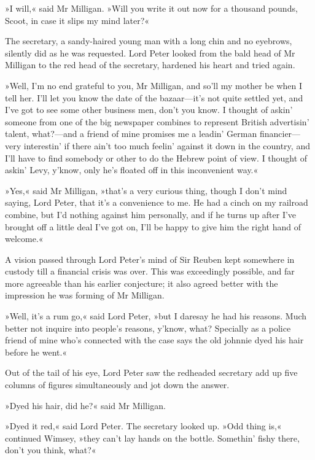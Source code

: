 »I will,« said Mr Milligan. »Will you write it out now for a thousand pounds, Scoot, in case it slips my mind later?«

The secretary, a sandy-haired young man with a long chin and no eyebrows, silently did as he was requested. Lord Peter looked from the bald head of Mr Milligan to the red head of the secretary, hardened his heart and tried again.

»Well, I'm no end grateful to you, Mr Milligan, and so'll my mother be when I tell her. I'll let you know the date of the bazaar\allowbreak---\allowbreak it's not quite settled yet, and I've got to see some other business men, don't you know. I thought of askin' someone from one of the big newspaper combines to represent British advertisin' talent, what?---and a friend of mine promises me a leadin' German financier\allowbreak---\allowbreak very interestin' if there ain't too much feelin' against it down in the country, and I'll have to find somebody or other to do the Hebrew point of view. I thought of askin' Levy, y'know, only he's floated off in this inconvenient way.«

»Yes,« said Mr Milligan, »that's a very curious thing, though I don't mind saying, Lord Peter, that it's a convenience to me. He had a cinch on my railroad combine, but I'd nothing against him personally, and if he turns up after I've brought off a little deal I've got on, I'll be happy to give him the right hand of welcome.«

A vision passed through Lord Peter's mind of Sir Reuben kept somewhere in custody till a financial crisis was over. This was exceedingly possible, and far more agreeable than his earlier conjecture; it also agreed better with the impression he was forming of Mr Milligan.

»Well, it's a rum go,« said Lord Peter, »but I daresay he had his reasons. Much better not inquire into people's reasons, y'know, what? Specially as a police friend of mine who's connected with the case says the old johnnie dyed his hair before he went.«

Out of the tail of his eye, Lord Peter saw the redheaded secretary add up five columns of figures simultaneously and jot down the answer.

»Dyed his hair, did he?« said Mr Milligan.

»Dyed it red,« said Lord Peter. The secretary looked up. »Odd thing is,« continued Wimsey, »they can't lay hands on the bottle. Somethin' fishy there, don't you think, what?«

